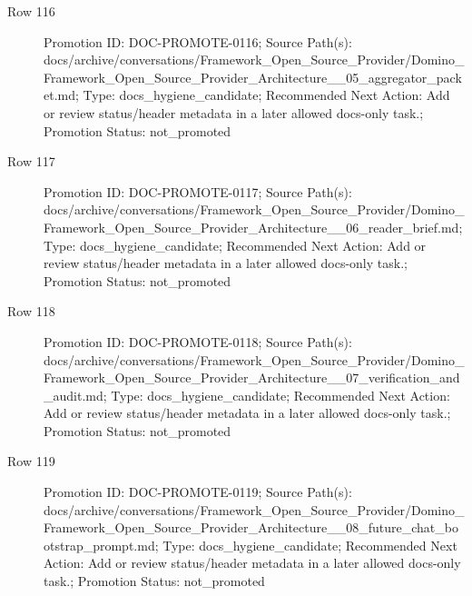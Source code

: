 \documentclass[9pt,a4paper,openany]{book}
\begin{document}
\begin{description}
\item[Row 116] Promotion ID: DOC-\allowbreak{}PROMOTE-\allowbreak{}0116; Source Path(s): docs/\allowbreak{}archive/\allowbreak{}conversations/\allowbreak{}Framework\_\allowbreak{}Open\_\allowbreak{}Source\_\allowbreak{}Provider/\allowbreak{}Domino\_\allowbreak{}Framework\_\allowbreak{}Open\_\allowbreak{}Source\_\allowbreak{}Provider\_\allowbreak{}Architecture\_\allowbreak{}\_\allowbreak{}05\_\allowbreak{}aggregator\_\allowbreak{}packet.\allowbreak{}md; Type: docs\_\allowbreak{}hygiene\_\allowbreak{}candidate; Recommended Next Action: Add or review status/\allowbreak{}header metadata in a later allowed docs-\allowbreak{}only task.\allowbreak{}; Promotion Status: not\_\allowbreak{}promoted
\item[Row 117] Promotion ID: DOC-\allowbreak{}PROMOTE-\allowbreak{}0117; Source Path(s): docs/\allowbreak{}archive/\allowbreak{}conversations/\allowbreak{}Framework\_\allowbreak{}Open\_\allowbreak{}Source\_\allowbreak{}Provider/\allowbreak{}Domino\_\allowbreak{}Framework\_\allowbreak{}Open\_\allowbreak{}Source\_\allowbreak{}Provider\_\allowbreak{}Architecture\_\allowbreak{}\_\allowbreak{}06\_\allowbreak{}reader\_\allowbreak{}brief.\allowbreak{}md; Type: docs\_\allowbreak{}hygiene\_\allowbreak{}candidate; Recommended Next Action: Add or review status/\allowbreak{}header metadata in a later allowed docs-\allowbreak{}only task.\allowbreak{}; Promotion Status: not\_\allowbreak{}promoted
\item[Row 118] Promotion ID: DOC-\allowbreak{}PROMOTE-\allowbreak{}0118; Source Path(s): docs/\allowbreak{}archive/\allowbreak{}conversations/\allowbreak{}Framework\_\allowbreak{}Open\_\allowbreak{}Source\_\allowbreak{}Provider/\allowbreak{}Domino\_\allowbreak{}Framework\_\allowbreak{}Open\_\allowbreak{}Source\_\allowbreak{}Provider\_\allowbreak{}Architecture\_\allowbreak{}\_\allowbreak{}07\_\allowbreak{}verification\_\allowbreak{}and\_\allowbreak{}audit.\allowbreak{}md; Type: docs\_\allowbreak{}hygiene\_\allowbreak{}candidate; Recommended Next Action: Add or review status/\allowbreak{}header metadata in a later allowed docs-\allowbreak{}only task.\allowbreak{}; Promotion Status: not\_\allowbreak{}promoted
\item[Row 119] Promotion ID: DOC-\allowbreak{}PROMOTE-\allowbreak{}0119; Source Path(s): docs/\allowbreak{}archive/\allowbreak{}conversations/\allowbreak{}Framework\_\allowbreak{}Open\_\allowbreak{}Source\_\allowbreak{}Provider/\allowbreak{}Domino\_\allowbreak{}Framework\_\allowbreak{}Open\_\allowbreak{}Source\_\allowbreak{}Provider\_\allowbreak{}Architecture\_\allowbreak{}\_\allowbreak{}08\_\allowbreak{}future\_\allowbreak{}chat\_\allowbreak{}bootstrap\_\allowbreak{}prompt.\allowbreak{}md; Type: docs\_\allowbreak{}hygiene\_\allowbreak{}candidate; Recommended Next Action: Add or review status/\allowbreak{}header metadata in a later allowed docs-\allowbreak{}only task.\allowbreak{}; Promotion Status: not\_\allowbreak{}promoted

\end{description}
\end{document}
